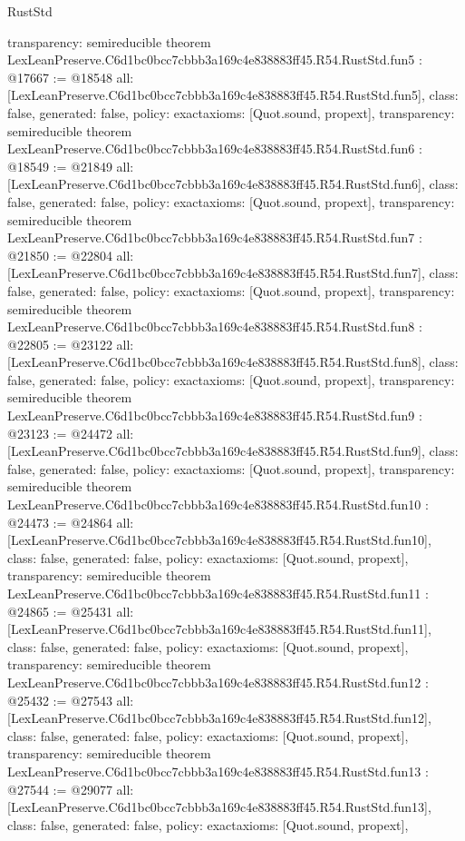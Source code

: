 \begin{lexlean}{RustStd}
\begin{coremodule}
{  transparency: semireducible
}
theorem LexLeanPreserve.C6d1bc0bcc7cbbb3a169c4e838883ff45.R54.RustStd.fun5 : @17667 := @18548 {
  all: [LexLeanPreserve.C6d1bc0bcc7cbbb3a169c4e838883ff45.R54.RustStd.fun5],
  class: false,
  generated: false,
  policy: exact{axioms: [Quot.sound, propext]},
  transparency: semireducible
}
theorem LexLeanPreserve.C6d1bc0bcc7cbbb3a169c4e838883ff45.R54.RustStd.fun6 : @18549 := @21849 {
  all: [LexLeanPreserve.C6d1bc0bcc7cbbb3a169c4e838883ff45.R54.RustStd.fun6],
  class: false,
  generated: false,
  policy: exact{axioms: [Quot.sound, propext]},
  transparency: semireducible
}
theorem LexLeanPreserve.C6d1bc0bcc7cbbb3a169c4e838883ff45.R54.RustStd.fun7 : @21850 := @22804 {
  all: [LexLeanPreserve.C6d1bc0bcc7cbbb3a169c4e838883ff45.R54.RustStd.fun7],
  class: false,
  generated: false,
  policy: exact{axioms: [Quot.sound, propext]},
  transparency: semireducible
}
theorem LexLeanPreserve.C6d1bc0bcc7cbbb3a169c4e838883ff45.R54.RustStd.fun8 : @22805 := @23122 {
  all: [LexLeanPreserve.C6d1bc0bcc7cbbb3a169c4e838883ff45.R54.RustStd.fun8],
  class: false,
  generated: false,
  policy: exact{axioms: [Quot.sound, propext]},
  transparency: semireducible
}
theorem LexLeanPreserve.C6d1bc0bcc7cbbb3a169c4e838883ff45.R54.RustStd.fun9 : @23123 := @24472 {
  all: [LexLeanPreserve.C6d1bc0bcc7cbbb3a169c4e838883ff45.R54.RustStd.fun9],
  class: false,
  generated: false,
  policy: exact{axioms: [Quot.sound, propext]},
  transparency: semireducible
}
theorem LexLeanPreserve.C6d1bc0bcc7cbbb3a169c4e838883ff45.R54.RustStd.fun10 : @24473 := @24864 {
  all: [LexLeanPreserve.C6d1bc0bcc7cbbb3a169c4e838883ff45.R54.RustStd.fun10],
  class: false,
  generated: false,
  policy: exact{axioms: [Quot.sound, propext]},
  transparency: semireducible
}
theorem LexLeanPreserve.C6d1bc0bcc7cbbb3a169c4e838883ff45.R54.RustStd.fun11 : @24865 := @25431 {
  all: [LexLeanPreserve.C6d1bc0bcc7cbbb3a169c4e838883ff45.R54.RustStd.fun11],
  class: false,
  generated: false,
  policy: exact{axioms: [Quot.sound, propext]},
  transparency: semireducible
}
theorem LexLeanPreserve.C6d1bc0bcc7cbbb3a169c4e838883ff45.R54.RustStd.fun12 : @25432 := @27543 {
  all: [LexLeanPreserve.C6d1bc0bcc7cbbb3a169c4e838883ff45.R54.RustStd.fun12],
  class: false,
  generated: false,
  policy: exact{axioms: [Quot.sound, propext]},
  transparency: semireducible
}
theorem LexLeanPreserve.C6d1bc0bcc7cbbb3a169c4e838883ff45.R54.RustStd.fun13 : @27544 := @29077 {
  all: [LexLeanPreserve.C6d1bc0bcc7cbbb3a169c4e838883ff45.R54.RustStd.fun13],
  class: false,
  generated: false,
  policy: exact{axioms: [Quot.sound, propext]},
}
\end{coremodule}
\end{lexlean}
